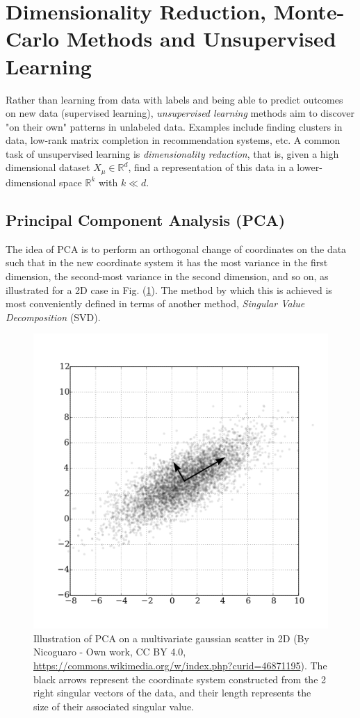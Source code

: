 \documentclass{article}
\begin{document}
\newpage
\section{Dimensionality Reduction, Monte-Carlo Methods and Unsupervised Learning}
Rather than learning from data with labels and being able to predict outcomes on new data (supervised learning), \emph{unsupervised learning} methods aim to discover "on their own" patterns in unlabeled data. Examples include finding clusters in data, low-rank matrix completion in recommendation systems, etc. A common task of unsupervised learning is \emph{dimensionality reduction}, that is, given a high dimensional dataset $X_{\mu} \in \mathbb{R}^d$, find a representation of this data in a lower-dimensional space $\mathbb{R}^k$ with $k\ll d$.

\subsection{Principal Component Analysis (PCA)}
The idea of PCA is to perform an orthogonal change of coordinates on the data such that in the new coordinate system it has the most variance in the first dimension, the second-most variance in the second dimension, and so on, as illustrated for a 2D case in Fig. (\ref{fig:pca}). The method by which this is achieved is most conveniently defined in terms of another method, \emph{Singular Value Decomposition} (SVD).
\begin{figure}[h]
    \centering
    \includegraphics[width=0.5\linewidth]{PCA}
    \caption{Illustration of PCA on a multivariate gaussian scatter in 2D (By Nicoguaro - Own work, CC BY 4.0, \url{https://commons.wikimedia.org/w/index.php?curid=46871195}). The black arrows represent the coordinate system constructed from the 2 right singular vectors of the data, and their length represents the size of their associated singular value.}
    \label{fig:pca}
\end{figure}
\end{document}
